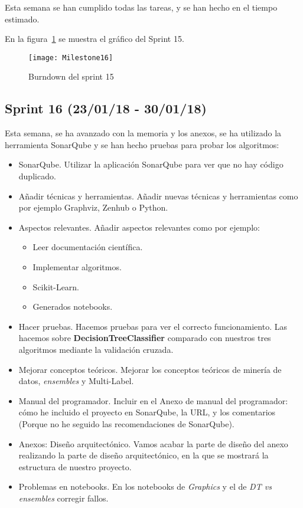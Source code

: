 Esta semana se han cumplido todas las tareas, y se han hecho en el tiempo estimado.

En la figura~\ref{fig:Milestone16} se muestra el gráfico del Sprint 15.

\begin{figure}
\centering
\texttt{[image: Milestone16]}
\caption{Burndown del sprint 15}
\label{fig:Milestone16}
\end{figure}

\subsection{Sprint 16 (23/01/18 - 30/01/18)}
Esta semana, se ha avanzado con la memoria y los anexos, se ha utilizado la herramienta SonarQube y se han hecho pruebas para probar los algoritmos:
\begin{itemize}
\item SonarQube. Utilizar la aplicación SonarQube para ver que no hay código duplicado.
\item Añadir técnicas y herramientas. Añadir nuevas técnicas y herramientas como por ejemplo Graphviz, Zenhub o Python.
\item Aspectos relevantes. Añadir aspectos relevantes como por ejemplo:
\begin{itemize}
	\item Leer documentación científica.
	\item Implementar algoritmos.
	\item Scikit-Learn.
	\item Generados notebooks.
\end{itemize}
\item Hacer pruebas. Hacemos pruebas para ver el correcto funcionamiento.
Las hacemos sobre \textbf{DecisionTreeClassifier} comparado con nuestros tres algoritmos mediante la validación cruzada.
\item Mejorar conceptos teóricos. Mejorar los conceptos teóricos de minería de datos, \textit{ensembles} y Multi-Label.
\item Manual del programador. Incluir en el Anexo de manual del programador: cómo he incluido el proyecto en SonarQube, la URL, y los comentarios (Porque no he seguido las recomendaciones de SonarQube).
\item Anexos: Diseño arquitectónico. Vamos acabar la parte de diseño del anexo realizando la parte de diseño arquitectónico, en la que se mostrará la estructura de nuestro proyecto.
\item Problemas en notebooks. En los notebooks de \textit{Graphics} y el de \textit{DT vs ensembles} corregir fallos.
\end{itemize}

